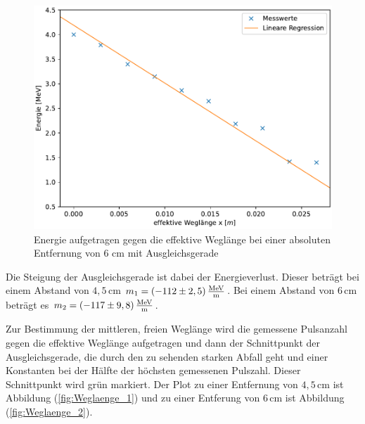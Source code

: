 \begin{figure}[H]
    \centering
    \includegraphics[width=\textwidth]{Plots/plot2.pdf}
    \caption{Energie aufgetragen gegen die effektive Weglänge bei einer absoluten Entfernung von 6 cm mit Ausgleichsgerade}
    \label{fig:Abstand_2}
\end{figure}

Die Steigung der Ausgleichsgerade ist dabei der Energieverlust. Dieser beträgt bei einem Abstand von $4,5 \, \unit{\centi\meter}$ $m_1 = (-112 \pm 2,5)\, 
\unit[per-mode=fraction]{\mega\eV\per\meter}$. Bei einem Abstand von $6 \, \unit{\centi\meter}$ beträgt es $m_2 = (-117 \pm 9,8)\, 
\unit[per-mode=fraction]{\mega\eV\per\meter}$. 

Zur Bestimmung der mittleren, freien Weglänge wird die gemessene Pulsanzahl gegen die effektive Weglänge aufgetragen und dann der Schnittpunkt der Ausgleichsgerade, 
die durch den zu sehenden starken Abfall geht und einer Konstanten bei der Hälfte der höchsten gemessenen Pulszahl. Dieser Schnittpunkt wird grün markiert. 
Der Plot zu einer Entfernung von $4,5 \, \unit{\centi\meter}$ ist Abbildung (\ref{fig:Weglaenge_1}) und zu einer Entferung von $6 \, \unit{\centi\meter}$ 
ist Abbildung (\ref{fig:Weglaenge_2}). 

